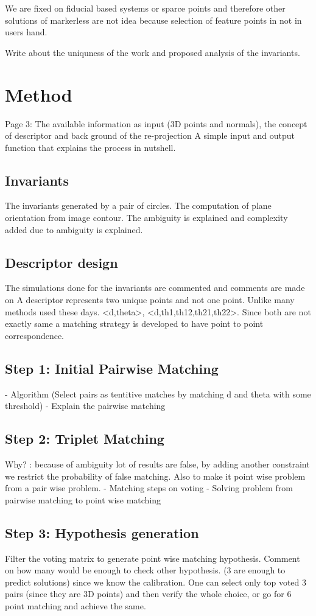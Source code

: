 \documentclass{bmvc2k}
\begin{document}
We are fixed on fiducial based systems or sparce points and therefore other solutions of markerless are not idea because selection of feature points in not in users hand.

Write about the uniquness of the work and proposed analysis of the invariants. 

\section{Method}
Page 3: 
The available information as input (3D points and normals), the concept of descriptor and back ground of the re-projection 
A simple input and output function that explains the process in nutshell. 
\subsection{Invariants}
The invariants generated by a pair of circles. 
The computation of plane orientation from image contour. 
The ambiguity is explained and complexity added due to ambiguity is explained. 
\subsection{Descriptor design}
The simulations done for the invariants are commented and comments are made on 
A descriptor represents two unique points and not one point. Unlike many methods used these days. 
<d,theta>, <d,th1,th12,th21,th22>. 
Since both are not exactly same a matching strategy is developed to have point to point correspondence.    
\subsection{Step 1: Initial Pairwise Matching}
- Algorithm (Select pairs as tentitive matches by matching d and theta with some threshold)
- Explain the pairwise matching 
\subsection{Step 2: Triplet Matching}
Why? : because of ambiguity lot of results are false, by adding another constraint we restrict the probability of false matching. Also to make it point wise problem from a pair wise problem. 
- Matching steps on voting 
- Solving problem from pairwise matching to point wise matching
\subsection{Step 3: Hypothesis generation}
Filter the voting matrix to generate point wise matching hypothesis. 
Comment on how many would be enough to check other hypothesis. 
(3 are enough to predict solutions) since we know the calibration. 
One can select only top voted 3 pairs (since they are 3D points) and then verify the whole choice, or go for 6 point matching and achieve the same.
\end{document}
